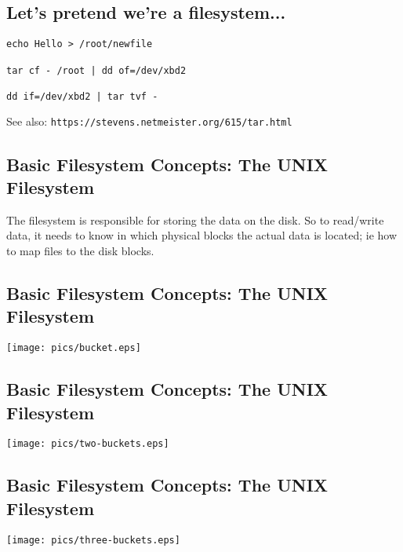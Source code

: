 \documentclass[xga]{xdvislides}
\begin{document}
\subsection{Let's pretend we're a filesystem...}
\begin{verbatim}
echo Hello > /root/newfile

tar cf - /root | dd of=/dev/xbd2

dd if=/dev/xbd2 | tar tvf -
\end{verbatim}
\vspace{1in}
See also: \verb+https://stevens.netmeister.org/615/tar.html+

\subsection{Basic Filesystem Concepts: The UNIX Filesystem}
The filesystem is responsible for storing the data on the disk.
So to read/write data, it needs to know in which physical blocks the actual
data is located; ie how to map files to the disk blocks.


\subsection{Basic Filesystem Concepts: The UNIX Filesystem}
\vspace*{\fill}
\begin{center}
\texttt{[image: pics/bucket.eps]} \\
\end{center}
\vspace*{\fill}

\subsection{Basic Filesystem Concepts: The UNIX Filesystem}
\begin{center}
\texttt{[image: pics/two-buckets.eps]} \\
\end{center}

\subsection{Basic Filesystem Concepts: The UNIX Filesystem}
\vspace*{\fill}
\begin{center}
\texttt{[image: pics/three-buckets.eps]} \\
\end{center}
\vspace*{\fill}
\end{document}
